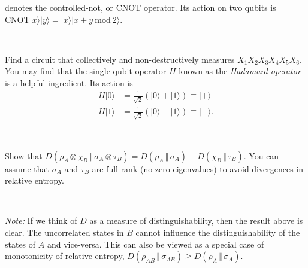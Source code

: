 \documentclass[a4paper,11pt]{article}
\newcommand{\ket}[1]{|#1\rangle}
\newcommand{\mrm}[1]{\mathrm{#1}}
\begin{document}
\noindent denotes the controlled-not, or CNOT operator.
Its action on two qubits is $\mrm{CNOT} \ket{x}\ket{y} = \ket{x} \ket{x + y ~ \mrm{mod}~2}$.

~

 Find a circuit that collectively and non-destructively measures $X_1 X_2 X_3 X_4 X_5 X_6$.
You may find that the single-qubit operator $H$ known as the \emph{Hadamard operator} is a helpful ingredient.
Its action is 
\begin{align*}
H \ket{0} &= \frac{1}{\sqrt{2}} \left( \ket{0} + \ket{1} \right) \equiv \ket{+} \\
H \ket{1} &= \frac{1}{\sqrt{2}} \left( \ket{0} - \ket{1} \right) \equiv \ket{-} .
\end{align*}

~


\noindent Show that $D(\rho_A \otimes \chi_B \, \Vert \, \sigma_A \otimes \tau_B) = D(\rho_A \, \Vert \, \sigma_A) + D(\chi_B \, \Vert \, \tau_B)$.
You can assume that $\sigma_A$ and $\tau_B$ are full-rank (no zero eigenvalues) to avoid divergences in relative entropy.

~

\noindent \emph{Note:} If we think of $D$ as a measure of distinguishability, then the result above is clear.
The uncorrelated states in $B$ cannot influence the distinguishability of the states of $A$ and vice-versa.
This can also be viewed as a special case of monotonicity of relative entropy, $D(\rho_{AB} \, \Vert \, \sigma_{AB}) \geq D(\rho_A \, \Vert \, \sigma_A)$.

\clearpage




\end{document}
